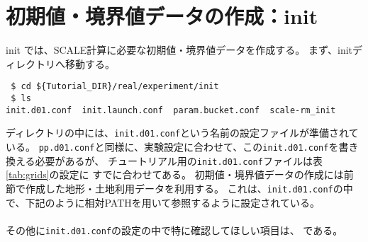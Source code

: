 \section{初期値・境界値データの作成：init} \label{sec:tutrial_real_init}

init では、SCALE計算に必要な初期値・境界値データを作成する。
まず、initディレクトリへ移動する。
\begin{verbatim}
 $ cd ${Tutorial_DIR}/real/experiment/init
 $ ls 
init.d01.conf  init.launch.conf  param.bucket.conf  scale-rm_init
\end{verbatim}
ディレクトリの中には、\verb|init.d01.conf|という名前の設定ファイルが準備されている。
\verb|pp.d01.conf|と同様に、実験設定に合わせて、この\verb|init.d01.conf|を書き換える必要があるが、
チュートリアル用の\verb|init.d01.conf|ファイルは表\ref{tab:grids}の設定に
すでに合わせてある。
初期値・境界値データの作成には前節で作成した地形・土地利用データを利用する。
これは、\verb|init.d01.conf|の中で、下記のように相対PATHを用いて参照するように設定されている。\\

\\

\noindent その他に\verb|init.d01.conf|の設定の中で特に確認してほしい項目は、
である。\\

